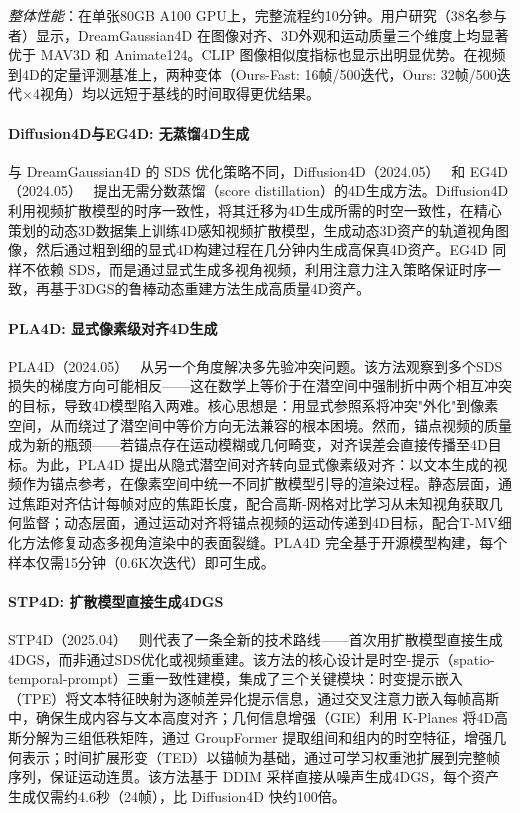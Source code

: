\textit{整体性能}：在单张80GB A100 GPU上，完整流程约10分钟。用户研究（38名参与者）显示，DreamGaussian4D 在图像对齐、3D外观和运动质量三个维度上均显著优于 MAV3D 和 Animate124。CLIP 图像相似度指标也显示出明显优势。在视频到4D的定量评测基准上，两种变体（Ours-Fast: 16帧/500迭代，Ours: 32帧/500迭代$\times$4视角）均以远短于基线的时间取得更优结果。

\paragraph{Diffusion4D与EG4D: 无蒸馏4D生成}

与 DreamGaussian4D 的 SDS 优化策略不同，Diffusion4D（2024.05）~\cite{2405_16645} 和 EG4D（2024.05）~\cite{2405_18132} 提出无需分数蒸馏（score distillation）的4D生成方法。Diffusion4D 利用视频扩散模型的时序一致性，将其迁移为4D生成所需的时空一致性，在精心策划的动态3D数据集上训练4D感知视频扩散模型，生成动态3D资产的轨道视角图像，然后通过粗到细的显式4D构建过程在几分钟内生成高保真4D资产。EG4D 同样不依赖 SDS，而是通过显式生成多视角视频，利用注意力注入策略保证时序一致，再基于3DGS的鲁棒动态重建方法生成高质量4D资产。

\paragraph{PLA4D: 显式像素级对齐4D生成}

PLA4D（2024.05）~\cite{2405_19957} 从另一个角度解决多先验冲突问题。该方法观察到多个SDS损失的梯度方向可能相反——这在数学上等价于在潜空间中强制折中两个相互冲突的目标，导致4D模型陷入两难。核心思想是：用显式参照系将冲突"外化"到像素空间，从而绕过了潜空间中等价方向无法兼容的根本困境。然而，锚点视频的质量成为新的瓶颈——若锚点存在运动模糊或几何畸变，对齐误差会直接传播至4D目标。为此，PLA4D 提出从隐式潜空间对齐转向显式像素级对齐：以文本生成的视频作为锚点参考，在像素空间中统一不同扩散模型引导的渲染过程。静态层面，通过焦距对齐估计每帧对应的焦距长度，配合高斯-网格对比学习从未知视角获取几何监督；动态层面，通过运动对齐将锚点视频的运动传递到4D目标，配合T-MV细化方法修复动态多视角渲染中的表面裂缝。PLA4D 完全基于开源模型构建，每个样本仅需15分钟（0.6K次迭代）即可生成。

\paragraph{STP4D: 扩散模型直接生成4DGS}

STP4D（2025.04）~\cite{2504_18318} 则代表了一条全新的技术路线——首次用扩散模型直接生成4DGS，而非通过SDS优化或视频重建。该方法的核心设计是时空-提示（spatio-temporal-prompt）三重一致性建模，集成了三个关键模块：时变提示嵌入（TPE）将文本特征映射为逐帧差异化提示信息，通过交叉注意力嵌入每帧高斯中，确保生成内容与文本高度对齐；几何信息增强（GIE）利用 K-Planes 将4D高斯分解为三组低秩矩阵，通过 GroupFormer 提取组间和组内的时空特征，增强几何表示；时间扩展形变（TED）以锚帧为基础，通过可学习权重池扩展到完整帧序列，保证运动连贯。该方法基于 DDIM 采样直接从噪声生成4DGS，每个资产生成仅需约4.6秒（24帧），比 Diffusion4D 快约100倍。

